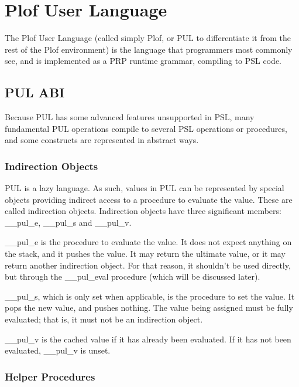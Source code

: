 \chapter{Plof User Language}

The Plof User Language (called simply Plof, or PUL to differentiate it from the rest of the Plof environment) is the language that programmers most commonly see, and is implemented as a PRP runtime grammar, compiling to PSL code.



\section{PUL ABI}

Because PUL has some advanced features unsupported in PSL, many fundamental PUL operations compile to several PSL operations or procedures, and some constructs are represented in abstract ways.



\subsection{Indirection Objects}

PUL is a lazy language. As such, values in PUL can be represented by special objects providing indirect access to a procedure to evaluate the value. These are called indirection objects. Indirection objects have three significant members: \_\_pul\_e, \_\_pul\_s and \_\_pul\_v.

\_\_pul\_e is the procedure to evaluate the value. It does not expect anything on the stack, and it pushes the value. It may return the ultimate value, or it may return another indirection object. For that reason, it shouldn't be used directly, but through the \_\_pul\_eval procedure (which will be discussed later).

\_\_pul\_s, which is only set when applicable, is the procedure to set the value. It pops the new value, and pushes nothing. The value being assigned must be fully evaluated; that is, it must not be an indirection object.

\_\_pul\_v is the cached value if it has already been evaluated. If it has not been evaluated, \_\_pul\_v is unset.



\subsection{Helper Procedures}

